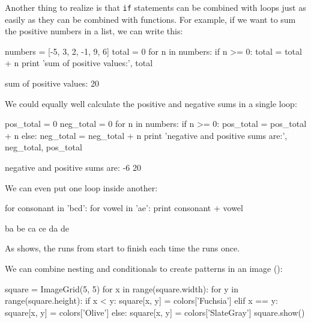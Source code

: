 Another thing to realize is that \texttt{if} statements can be combined
with loops just as easily as they can be combined with functions. For
example, if we want to sum the positive numbers in a list, we can write
this:

\begin{VerbIn}
numbers = [-5, 3, 2, -1, 9, 6]
total = 0
for n in numbers:
    if n >= 0:
        total = total + n
print 'sum of positive values:', total
\end{VerbIn}

\begin{VerbOut}
sum of positive values: 20
\end{VerbOut}

We could equally well calculate the positive and negative sums in a
single loop:

\begin{VerbIn}
pos_total = 0
neg_total = 0
for n in numbers:
    if n >= 0:
        pos_total = pos_total + n
    else:
        neg_total = neg_total + n
print 'negative and positive sums are:', neg_total, pos_total
\end{VerbIn}

\begin{VerbOut}
negative and positive sums are: -6 20
\end{VerbOut}

We can even put one loop inside another:

\begin{VerbIn}
for consonant in 'bcd':
    for vowel in 'ae':
        print consonant + vowel
\end{VerbIn}

\begin{VerbOut}
ba
be
ca
ce
da
de
\end{VerbOut}

As  shows, the  runs
from start to finish each time the 
runs once.


We can combine nesting and conditionals to create patterns in an image ():

\begin{VerbIn}
square = ImageGrid(5, 5)
for x in range(square.width):
    for y in range(square.height):
        if x < y:
            square[x, y] = colors['Fuchsia']
        elif x == y:
            square[x, y] = colors['Olive']
        else:
            square[x, y] = colors['SlateGray']
square.show()
\end{VerbIn}

